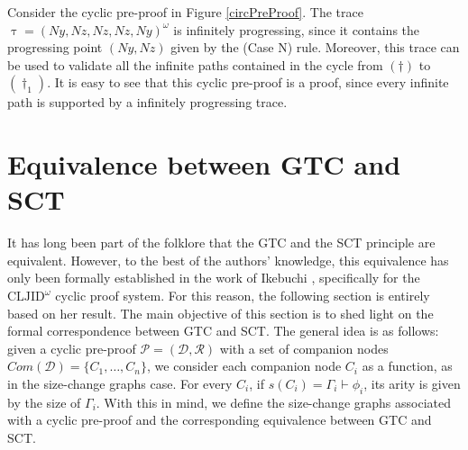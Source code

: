 \documentclass{article}
\begin{document}
\begin{example}
    Consider the cyclic pre-proof in Figure \ref{circPreProof}. The trace $\uptau = (Ny, Nz, Nz, Nz, Ny)^{\omega}$ is infinitely progressing, since it contains the progressing point $(Ny,Nz)$ given by the (Case N) rule. Moreover, this trace can be used to validate all the infinite paths contained in the cycle from $(\dag)$ to $(\dag_1)$. It is easy to see that this cyclic pre-proof is a proof, since every infinite path is supported by a infinitely progressing trace.
\end{example}



\section{Equivalence between GTC and SCT}
It has long been part of the folklore that the GTC and the SCT principle are equivalent. However, to the best of the authors' knowledge, this equivalence has only been formally established in the work of Ikebuchi \cite{Mirai}, specifically for the $\text{CLJID}^{\omega}$ cyclic proof system. For this reason, the following section is entirely based on her result. The main objective of this section is to shed light on the formal correspondence between GTC and SCT. The general idea is as follows: given a cyclic pre-proof $\mathcal{P} = (\mathcal{D}, \mathcal{R})$ with a set of companion nodes $Com(\mathcal{D}) = \{C_1, \ldots, C_n\}$, we consider each companion node $C_i$ as a function, as in the size-change graphs case. For every $C_i$, if $s(C_i) = \Gamma_i \vdash \phi_i$, its arity is given by the size of $\Gamma_i$. With this in mind, we define the size-change graphs associated with a cyclic pre-proof and the corresponding equivalence between GTC and SCT.
\end{document}
